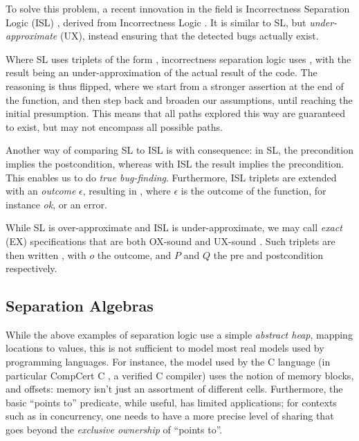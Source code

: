 To solve this problem, a recent innovation in the field is Incorrectness Separation Logic (ISL) \cite{isl}, derived from Incorrectness Logic \cite{incorrectnesslogic}. It is similar to SL, but \emph{under-approximate} (UX), instead ensuring that the detected bugs actually exist.

Where SL uses triplets of the form , incorrectness separation logic uses , with the result being an under-approximation of the actual result of the code. The reasoning is thus flipped, where we start from a stronger assertion at the end of the function, and then step back and broaden our assumptions, until reaching the initial presumption. This means that all paths explored this way are guaranteed to exist, but may not encompass all possible paths. 

Another way of comparing SL to ISL is with consequence: in SL, the precondition implies the postcondition, whereas with ISL the result implies the precondition. This enables us to do \emph{true bug-finding}. Furthermore, ISL triplets are extended with an \emph{outcome} $\epsilon$, resulting in , where $\epsilon$ is the outcome of the function, for instance \textit{ok}, or an error.

While SL is over-approximate and ISL is under-approximate, we may call \emph{exact} (EX) specifications that are both OX-sound and UX-sound \cite{exactsl}. Such triplets are then written , with $o$ the outcome, and $P$ and $Q$ the pre and postcondition respectively.

\subsection{Separation Algebras}

While the above examples of separation logic use a simple \emph{abstract heap}, mapping locations to values, this is not sufficient to model most real models used by programming languages. For instance, the model used by the C language (in particular CompCert C \cite{compcert}, a verified C compiler) uses the notion of memory blocks, and offsets: memory isn't just an assortment of different cells. Furthermore, the basic ``points to'' predicate, while useful, has limited applications; for contexts such as in concurrency, one needs to have a more precise level of sharing that goes beyond the \emph{exclusive ownership} of ``points to''.

